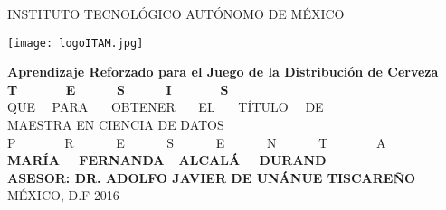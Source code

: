 
\begin{titlepage}
\begin{center}
\Large {INSTITUTO TECNOLÓGICO AUTÓNOMO DE MÉXICO}

 \vspace{0.5 cm}
  \centering
    \texttt{[image: logoITAM.jpg]}

 \vspace{0.5 cm}
 \textbf{Aprendizaje Reforzado para el Juego de la Distribuci\'on de Cerveza}
  \vspace{2 cm}\\
  \Huge{\textbf{T \ \ \ \ \ \ E \ \ \ \ \ S \ \ \ \ \ I \ \ \ \ \ \ S}}
    \vspace{.4cm}\\
  \Large{QUE  \ \ PARA \ \ \ OBTENER \ \ \ EL \ \ \ TÍTULO \ \ DE 
   \vspace{.4cm}\\
  MAESTRA EN CIENCIA DE DATOS 
   \vspace{.4cm}\\
  P \ \ \ \ \ \ \ R \ \ \ \ \ \ E \ \ \ \ \ \ S \ \ \ \ \ \ E \ \ \ \ \ \ N \ \ \ \ \ \ T \ \ \ \ \ \ \ A 
   \vspace{.4cm}\\
 \textbf{MAR\'IA \ \ FERNANDA\ \ ALCAL\'A \ \ DURAND}}
    \vspace{1 cm}\\
\normalsize \textbf{ASESOR: DR. ADOLFO JAVIER DE UN\'ANUE TISCARE\~NO}
\vspace{1cm}\\
MÉXICO, D.F \hfill{2016}
\end{center}
\end{titlepage}

